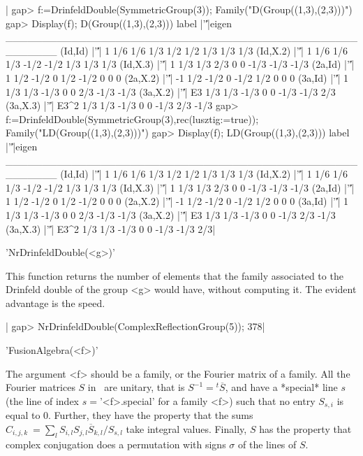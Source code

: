 |    gap> f:=DrinfeldDouble(SymmetricGroup(3));
    Family("D(Group((1,3),(2,3)))")
    gap> Display(f);
    D(Group((1,3),(2,3)))
       label |'\|'|eigen
    _______________________________________________________
    (Id,Id)  |'\|'|    1 1/6  1/6  1/3  1/2  1/2  1/3  1/3  1/3
    (Id,X.2) |'\|'|    1 1/6  1/6  1/3 -1/2 -1/2  1/3  1/3  1/3
    (Id,X.3) |'\|'|    1 1/3  1/3  2/3    0    0 -1/3 -1/3 -1/3
    (2a,Id)  |'\|'|    1 1/2 -1/2    0  1/2 -1/2    0    0    0
    (2a,X.2) |'\|'|   -1 1/2 -1/2    0 -1/2  1/2    0    0    0
    (3a,Id)  |'\|'|    1 1/3  1/3 -1/3    0    0  2/3 -1/3 -1/3
    (3a,X.2) |'\|'|   E3 1/3  1/3 -1/3    0    0 -1/3 -1/3  2/3
    (3a,X.3) |'\|'| E3^2 1/3  1/3 -1/3    0    0 -1/3  2/3 -1/3
    gap> f:=DrinfeldDouble(SymmetricGroup(3),rec(lusztig:=true));
    Family("LD(Group((1,3),(2,3)))")
    gap> Display(f);
    LD(Group((1,3),(2,3)))
       label |'\|'|eigen
    _______________________________________________________
    (Id,Id)  |'\|'|    1 1/6  1/6  1/3  1/2  1/2  1/3  1/3  1/3
    (Id,X.2) |'\|'|    1 1/6  1/6  1/3 -1/2 -1/2  1/3  1/3  1/3
    (Id,X.3) |'\|'|    1 1/3  1/3  2/3    0    0 -1/3 -1/3 -1/3
    (2a,Id)  |'\|'|    1 1/2 -1/2    0  1/2 -1/2    0    0    0
    (2a,X.2) |'\|'|   -1 1/2 -1/2    0 -1/2  1/2    0    0    0
    (3a,Id)  |'\|'|    1 1/3  1/3 -1/3    0    0  2/3 -1/3 -1/3
    (3a,X.2) |'\|'|   E3 1/3  1/3 -1/3    0    0 -1/3  2/3 -1/3
    (3a,X.3) |'\|'| E3^2 1/3  1/3 -1/3    0    0 -1/3 -1/3  2/3|


'NrDrinfeldDouble(<g>)'

This function returns the number of elements that the family associated to the
Drinfeld double of the group <g> would have, without computing it. The evident
advantage is the speed.

|    gap> NrDrinfeldDouble(ComplexReflectionGroup(5));
    378|


'FusionAlgebra(<f>)'

The argument <f> should be a family, or the Fourier matrix of a family. All
the Fourier matrices $S$ in \CHEVIE\ are unitary, that is
$S^{-1}={}^t{\overline  S}$, and  have a  *special* line  $s$ (the  line of
index  $s=$'<f>.special' for a family <f>)  such that no entry $S_{s,i}$ is
equal to $0$. Further, they have the property that the sums
$C_{i,j,k}\:=\sum_l   S_{i,l}   S_{j,l}{\overline   S}_{k,l}/S_{s,l}$  take
integral  values. Finally,  $S$ has  the property  that complex conjugation
does a permutation with signs $\sigma$ of the lines of $S$.

